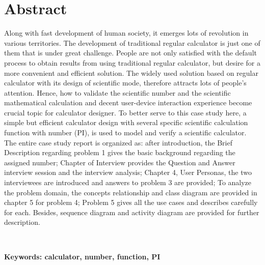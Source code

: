 \chapter*{Abstract}
\noindent
Along with fast development of human society, it emerges lots of revolution in various territories. The development of traditional regular calculator is just one of them that is under great challenge. People are not only satisfied with the default process to obtain results from using traditional regular calculator, but desire for a more convenient and efficient solution. The widely used solution based on regular calculator with its design of scientific mode, therefore attracts lots of people’s attention. Hence, how to validate the scientific number and the scientific mathematical calculation and decent user-device interaction experience become crucial topic for calculator designer. 
To better serve to this case study here, a simple but efficient calculator design with several specific scientific calculation function with number (PI), is used to model and verify a scientific calculator. The entire case study report is organized as: after introduction, the Brief Description regarding problem 1 gives the basic background regarding the assigned number; Chapter of Interview provides the Question and Answer interview session and the interview analysis; Chapter 4, User Personas, the two interviewees are introduced and answers to problem 3 are provided; To analyze the problem domain, the concepts relationship and class diagram are provided in chapter 5 for problem 4; Problem 5 gives all the use cases and describes carefully for each. Besides, sequence diagram and activity diagram are provided for further description.

\\
\begin{spacing}{1.0} 
\end{spacing} 
\noindent
{\textbf{Keywords: calculator, number, function, PI} }




